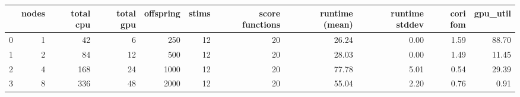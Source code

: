 \begin{tabular}{lrrrrrrrrrr}
\toprule
{} &  nodes &  total cpu &  total gpu &  offspring &  stims &  score functions & runtime (mean) & runtime stddev & cori fom & gpu\_util \\
\midrule
0 &      1 &         42 &          6 &        250 &     12 &               20 &          26.24 &           0.00 &     1.59 &    88.70 \\
1 &      2 &         84 &         12 &        500 &     12 &               20 &          28.03 &           0.00 &     1.49 &    11.45 \\
2 &      4 &        168 &         24 &       1000 &     12 &               20 &          77.78 &           5.01 &     0.54 &    29.39 \\
3 &      8 &        336 &         48 &       2000 &     12 &               20 &          55.04 &           2.20 &     0.76 &     0.91 \\
\bottomrule
\end{tabular}
